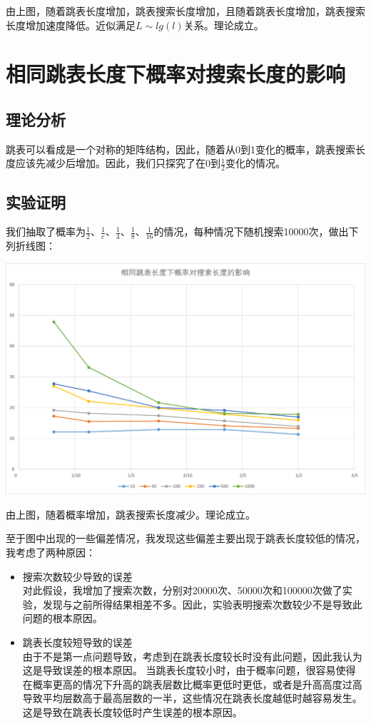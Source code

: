 \documentclass[UTF8]{ctexart}
\begin{document}
由上图，随着跳表长度增加，跳表搜索长度增加，且随着跳表长度增加，跳表搜索长度增加速度降低。近似满足$L\sim lg(l)$关系。理论成立。

\section{相同跳表长度下概率对搜索长度的影响}
\subsection{理论分析}
跳表可以看成是一个对称的矩阵结构，因此，随着从0到1变化的概率，跳表搜索长度应该先减少后增加。因此，我们只探究了在0到$\frac{1}{2}$变化的情况。
\subsection{实验证明}
我们抽取了概率为$\frac{1}{2}$、$\frac{1}{e}$、$\frac{1}{4}$、$\frac{1}{8}$、$\frac{1}{16}$的情况，每种情况下随机搜索10000次，做出下列折线图：
\begin{center}
    \includegraphics[scale=0.6]{Probility.png}
\end{center}

由上图，随着概率增加，跳表搜索长度减少。理论成立。

至于图中出现的一些偏差情况，我发现这些偏差主要出现于跳表长度较低的情况，我考虑了两种原因：
\begin{itemize}
    \item 搜索次数较少导致的误差\\
    对此假设，我增加了搜索次数，分别对20000次、50000次和100000次做了实验，发现与之前所得结果相差不多。因此，实验表明搜索次数较少不是导致此问题的根本原因。
    \item 跳表长度较短导致的误差\\
    由于不是第一点问题导致，考虑到在跳表长度较长时没有此问题，因此我认为这是导致误差的根本原因。
    当跳表长度较小时，由于概率问题，很容易使得在概率更高的情况下升高的跳表层数比概率更低时更低，或者是升高高度过高导致平均层数高于最高层数的一半，这些情况在跳表长度越低时越容易发生。这是导致在跳表长度较低时产生误差的根本原因。
\end{itemize}


\end{document}
